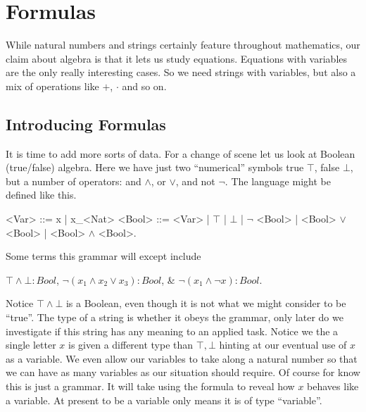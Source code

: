 \section{Formulas}
While natural numbers and strings certainly feature throughout mathematics, 
our claim about algebra is that it lets us study equations.  Equations 
with variables are the only really interesting cases.  So we need 
strings with variables, but also a mix of operations like $+$, $\cdot$ and 
so on.

\subsection{Introducing Formulas}
It is time to add more sorts of data.  For a change of scene let us look 
at Boolean (true/false) algebra.  Here we have just two ``numerical''
symbols true $\top$,
false $\bot$, but a number of operators: and $\wedge$, or $\vee$, and not $\neg$.
The language might be defined
like this.
\begin{Gcode}[]
<Var>  ::= x | x_<Nat>
<Bool> ::= <Var>
        | $\top$
        | $\bot$
        | $\neg$ <Bool> 
        | <Bool> $\vee$ <Bool> 
        | <Bool> $\wedge$ <Bool>.
\end{Gcode}
Some terms this grammar will except include 
\begin{center}
    $\top \wedge \bot :Bool$, 
    $\neg (x_1\wedge x_2\vee x_3):Bool$, \&
    $\neg(x_1\wedge \neg x):Bool$.
\end{center}
Notice $\top\wedge \bot$ is a Boolean, even though it is not what we might 
consider to be ``true''.   The type of a string is whether it obeys the grammar,
only later do we investigate if this string has any meaning to an applied task.
Notice we the a single letter $x$ is given a different type than $\top,\bot$
hinting at our eventual use of $x$ as a variable.  We even allow our variables 
to take along a natural number so that we can have as many variables as our situation 
should require.  Of course for know this is just a grammar.  It will take using 
the formula to reveal how $x$ behaves like a variable.  At present to be 
a variable only means it is of type ``variable''.



